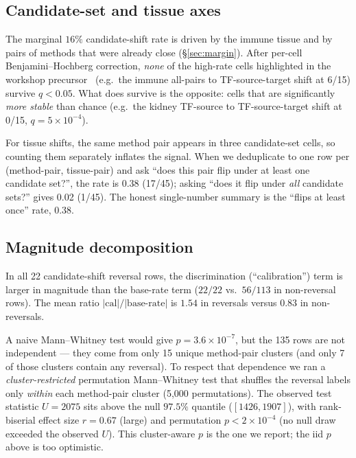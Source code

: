 \documentclass[sigconf,anonymous]{acmart}
\begin{document}
\subsection{Candidate-set and tissue axes}
\label{sec:tissue}

The marginal $16\%$ candidate-shift rate is driven by the immune tissue
and by pairs of methods that were already close (\S\ref{sec:margin}). After
per-cell Benjamini--Hochberg correction, \emph{none} of the high-rate
cells highlighted in the workshop precursor~\cite{anon2025evalbias} (e.g.\
the immune all-pairs to TF-source-target shift at 6/15) survive $q < 0.05$. What does survive is
the opposite: cells that are significantly \emph{more stable} than chance
(e.g.\ the kidney TF-source to TF-source-target shift at 0/15,
$q = 5 \times 10^{-4}$).

For tissue shifts, the same method pair appears in three candidate-set
cells, so counting them separately inflates the signal. When we
deduplicate to one row per (method-pair, tissue-pair) and ask ``does this
pair flip under at least one candidate set?'', the rate is 0.38 (17/45);
asking ``does it flip under \emph{all} candidate sets?'' gives 0.02
(1/45). The honest single-number summary is the ``flips at least once''
rate, 0.38.

\subsection{Magnitude decomposition}
\label{sec:magnitude}

In all 22 candidate-shift reversal rows, the discrimination (``calibration'')
term is larger in magnitude than the base-rate term ($22/22$ vs.\ $56/113$
in non-reversal rows). The mean ratio
$|\text{cal}|/|\text{base-rate}|$ is $1.54$ in reversals versus $0.83$ in
non-reversals.

A naive Mann--Whitney test would give $p = 3.6 \times 10^{-7}$, but the
135 rows are not independent --- they come from only 15 unique method-pair
clusters (and only 7 of those clusters contain any reversal). To respect
that dependence we ran a \emph{cluster-restricted} permutation Mann--Whitney
test that shuffles the reversal labels only \emph{within} each
method-pair cluster (5{,}000 permutations). The observed test statistic
$U = 2075$ sits above the null $97.5\%$ quantile ($[1426, 1907]$), with
rank-biserial effect size $r = 0.67$ (large) and permutation
$p < 2 \times 10^{-4}$ (no null draw exceeded the observed $U$). This
cluster-aware $p$ is the one we report; the iid $p$ above is too
optimistic.
\end{document}
